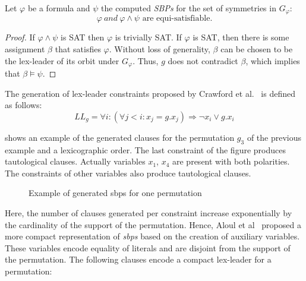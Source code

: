 \begin{theorem}
 \label{theorem:satisfiability_preservation_SBPs}
 Let $\varphi$ be a formula and $\psi$ the computed \textit{SBPs} for the set of symmetries in $G_{\varphi}$: 
 $$\varphi~and ~\varphi \wedge \psi \text{ are equi-satisfiable}.$$
\end{theorem}

\begin{proof}
 If $\varphi \wedge \psi$ is SAT then $\varphi$ is trivially SAT. If
 $\varphi$ is SAT, then there is some assignment $\beta$ that satisfies $\varphi$.
 Without loss of generality, $\beta$ can be chosen to be the lex-leader of its
 orbit under $G_{\varphi}$. Thus, $g$ does not contradict $\beta$, which implies that
 $\beta \models \psi$.
\end{proof}

%
%
%
The generation of lex-leader constraints proposed by Crawford et al.~\cite{crawford1996symmetry} is defined as follows:
$$ LL_g = \forall i : (\forall j < i : x_j = g.x_j) \Rightarrow  \neg x_i \lor g.x_i$$
 
  shows an example of the generated clauses for the  permutation $g_3$ of the previous 
 example and a lexicographic order. The last constraint of the figure produces tautological clauses.
 Actually variables $x_1$, $x_4$ are present with both polarities. The constraints of other variables also produce 
 tautological clauses. 
 
 \begin{figure}[!htbp]
  
  \caption{Example of generated sbps for one permutation}
  \label{fig:esbp_gen}
 \end{figure}
Here, the number of clauses generated per constraint increase exponentially by the 
cardinality of the support  of the permutation. Hence, Aloul et al~\cite{aloul06} proposed a more compact representation of \textit{sbps} based on the creation of auxiliary variables.  
These variables encode equality of literals and are disjoint from the support of the permutation.
The following clauses encode a compact lex-leader for a permutation:


